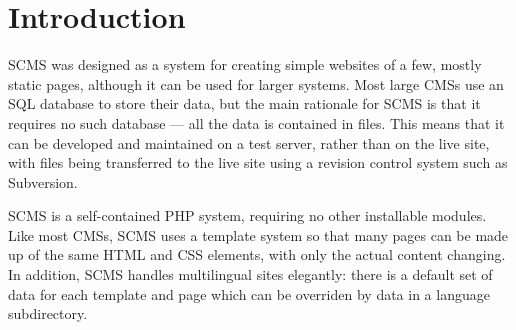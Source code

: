 %
%
%
%
%
%
% 
%
% 
% 
%

\chapter{Introduction}

SCMS was designed as a system for creating simple websites of a few, mostly
static pages, although it can be used for larger systems. Most large CMSs
use an SQL database to store their data, but the main rationale for SCMS
is that it requires no such database --- all the data is contained in files.
This means that it can be developed and maintained on a test server, rather
than on the live site, with files being transferred to the live site using
a revision control system such as Subversion.

SCMS is a self-contained PHP system, requiring no other installable modules.
Like most CMSs, SCMS uses a template system so that many pages can be made
up of the same HTML and CSS elements, with only the actual content changing.
In addition, SCMS handles multilingual sites elegantly: there is a default
set of data for each template and page which can be overriden by data in 
a language subdirectory.

